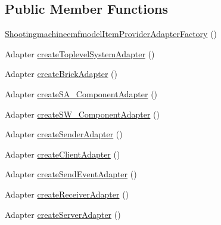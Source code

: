 \subsection*{Public Member Functions}
\begin{DoxyCompactItemize}
\item 
\hyperlink{classshootingmachineemfmodel_1_1provider_1_1_shootingmachineemfmodel_item_provider_adapter_factory_a56b08b209ad1ce09ab861bb07931f830}{Shootingmachineemfmodel\-Item\-Provider\-Adapter\-Factory} ()
\item 
Adapter \hyperlink{classshootingmachineemfmodel_1_1provider_1_1_shootingmachineemfmodel_item_provider_adapter_factory_a39619e0e8b83c2aef0b09d95c967a67f}{create\-Toplevel\-System\-Adapter} ()
\item 
Adapter \hyperlink{classshootingmachineemfmodel_1_1provider_1_1_shootingmachineemfmodel_item_provider_adapter_factory_acc0aa2547fd5bf8e28d1026f11606dae}{create\-Brick\-Adapter} ()
\item 
Adapter \hyperlink{classshootingmachineemfmodel_1_1provider_1_1_shootingmachineemfmodel_item_provider_adapter_factory_a76dd0b02ca1d688c8c4adec738242e8d}{create\-S\-A\-\_\-\-Component\-Adapter} ()
\item 
Adapter \hyperlink{classshootingmachineemfmodel_1_1provider_1_1_shootingmachineemfmodel_item_provider_adapter_factory_a3eb9d6ae3614709aef354b8455e0cf16}{create\-S\-W\-\_\-\-Component\-Adapter} ()
\item 
Adapter \hyperlink{classshootingmachineemfmodel_1_1provider_1_1_shootingmachineemfmodel_item_provider_adapter_factory_a33a365ffc5dcc01d94019dbd1dfb8ed9}{create\-Sender\-Adapter} ()
\item 
Adapter \hyperlink{classshootingmachineemfmodel_1_1provider_1_1_shootingmachineemfmodel_item_provider_adapter_factory_a0cfd2664d1be927f56ef4ceae95009be}{create\-Client\-Adapter} ()
\item 
Adapter \hyperlink{classshootingmachineemfmodel_1_1provider_1_1_shootingmachineemfmodel_item_provider_adapter_factory_aab8a12e52fec76d83756683b912c33c9}{create\-Send\-Event\-Adapter} ()
\item 
Adapter \hyperlink{classshootingmachineemfmodel_1_1provider_1_1_shootingmachineemfmodel_item_provider_adapter_factory_ab5c01559e8d03f7cca79722fdda456d3}{create\-Receiver\-Adapter} ()
\item 
Adapter \hyperlink{classshootingmachineemfmodel_1_1provider_1_1_shootingmachineemfmodel_item_provider_adapter_factory_a6ca4757fd53a6b88322d29b73a2aeb5c}{create\-Server\-Adapter} ()

\end{DoxyCompactItemize}
